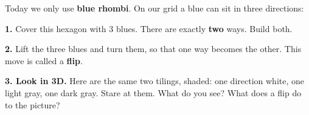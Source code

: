
\renewcommand{\bandname}{Grades 4--5}
\renewcommand{\bandcolor}{pbblue}
\newcommand{\recgrid}[1]{\begin{tabular}{@{}c@{}}\fig{g45_tall_rec}\\[2pt]\textbf{#1}\end{tabular}}
\newcommand{\bigrec}{\fig{g45_big_rec}}

\large

\nameline
Today we only use \textbf{blue rhombi}. On our grid a blue can sit in three directions:

\vspace{0.08in}
\centerline{}

\vspace{0.15in}
\noindent
\begin{minipage}[c]{2.3in}\end{minipage}\hfill
\begin{minipage}[c]{4.9in}
\textbf{1.} Cover this hexagon with 3 blues.
There are exactly \textbf{two} ways. Build both.

\vspace{0.12in}
\textbf{2.} Lift the three blues and turn them, so that one way becomes the other.
This move is called a \textbf{flip}.
\end{minipage}

\vspace{0.1in}
\begin{center}\end{center}

\vspace{0.05in}
\textbf{3. Look in 3D.} Here are the same two tilings, shaded: one direction white,
one light gray, one dark gray. Stare at them. What do you see?
What does a flip do to the picture?

\vspace{0.05in}
\begin{center}\end{center}

\vspace{0.12in}
\newpage


